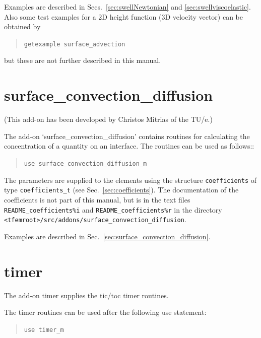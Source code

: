 Examples are described in Secs.~\ref{sec:swellNewtonian} and
\ref{sec:swellviscoelastic}. Also some
test examples for a 2D height function (3D velocity vector) can be obtained by
\begin{quote}
   \texttt{getexample surface\_advection}
\end{quote}
but these are not further described in this manual.


\section{surface\_convection\_diffusion}
\label{sec:surfaceconvectiondiffusionaddon}

(This add-on has been developed by Christos Mitrias of the TU/e.)

The add-on `surface\_convection\_diffusion' contains routines for calculating the concentration
of a quantity on an interface.
The routines can be used as follows::
\begin{quote}
   \texttt{use surface\_convection\_diffusion\_m}\\
\end{quote}
The parameters are
supplied to the elements using the structure \texttt{coefficients} of type
\texttt{coefficients\_t} (see Sec.~\ref{sec:coefficients}). The documentation
of the coefficients is not part of this manual, but is in the text files
\texttt{README\_coefficients\%i} and
\texttt{README\_coefficients\%r} in the directory
\texttt{<tfemroot>/src/addons/surface\_convection\_diffusion}.

Examples are described in Sec.~\ref{sec:surface_convection_diffusion}.

\section{timer}
\label{sec:timer}

The add-on timer supplies the tic/toc timer routines.

The timer routines can be used after the following use statement:
\begin{quote}
   \texttt{use timer\_m}
\end{quote}

